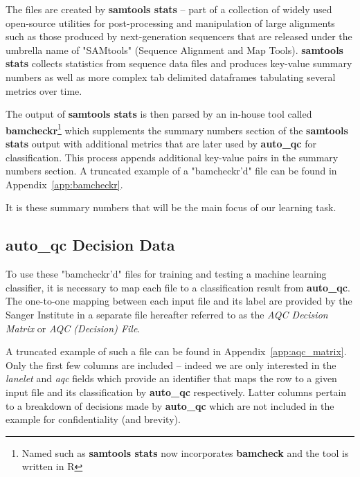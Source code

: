 The files are created by \textbf{samtools stats} -- part of a collection of
widely used open-source utilities for post-processing and manipulation of large
alignments such as those produced by next-generation sequencers that are
released under the umbrella name of "SAMtools"\citep{samtools} (Sequence
Alignment and Map Tools). \textbf{samtools stats} collects statistics from
sequence data files and produces key-value summary numbers as well as more
complex tab delimited dataframes tabulating several metrics over time.

The output of \textbf{samtools stats} is then parsed by an in-house tool called
\textbf{bamcheckr}\footnote{Named such as \textbf{samtools stats} now incorporates
\textbf{bamcheck} and the tool is written in R} which supplements the summary
numbers section of the \textbf{samtools stats} output with additional metrics
that are later used by \textbf{auto\_qc} for classification.  This process
appends additional key-value pairs in the summary numbers section.  A truncated
example of a "bamcheckr'd" file can be found in Appendix~\ref{app:bamcheckr}.

It is these summary numbers that will be the main focus of our learning task.


\subsection{auto\_qc Decision Data}

To use these "bamcheckr'd" files for training and testing a machine learning
classifier, it is necessary to map each file to a classification result from
\textbf{auto\_qc}. The one-to-one mapping between each input file and its label
are provided by the Sanger Institute in a separate file hereafter referred to as
the \textit{AQC Decision Matrix} or \textit{AQC (Decision) File}.

A truncated example of such a file can be found in
Appendix~\ref{app:aqc_matrix}.  Only the first few columns are included --
indeed we are only interested in the \textit{lanelet} and \textit{aqc} fields
which provide an identifier that maps the row to a given input file and its
classification by \textbf{auto\_qc} respectively.  Latter columns pertain to a
breakdown of decisions made by \textbf{auto\_qc} which are not included in the
example for confidentiality (and brevity).


